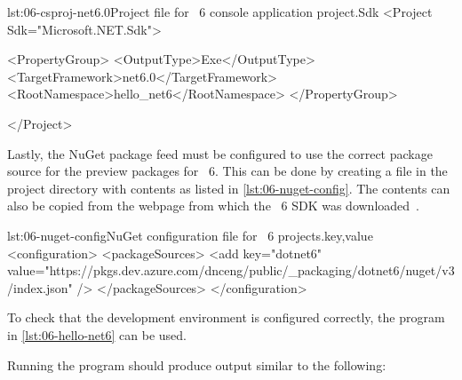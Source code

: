\begin{myListingXml}{lst:06-csproj-net6.0}{Project file for \dotnet{}~6 console application project.}{Sdk}
<Project Sdk="Microsoft.NET.Sdk">

  <PropertyGroup>
    <OutputType>Exe</OutputType>
    <TargetFramework>net6.0</TargetFramework>
    <RootNamespace>hello_net6</RootNamespace>
  </PropertyGroup>

</Project>
\end{myListingXml}

Lastly, the NuGet package feed must be configured to use the correct package source for the preview
packages for \dotnet{}~6. This can be done by creating a  file in the project
directory with contents as listed in \autoref{lst:06-nuget-config}. The contents can also be copied
from the webpage from which the \dotnet{}~6 SDK was downloaded~\cite{dotnetSdkGithub}.

\begin{myListingXml}[basicstyle=\ttfamily\scriptsize]{lst:06-nuget-config}{NuGet configuration file for \dotnet{}~6 projects.}{key,value}
<configuration>
  <packageSources>
    <add key="dotnet6"
      value="https://pkgs.dev.azure.com/dnceng/public/_packaging/dotnet6/nuget/v3/index.json" />
  </packageSources>
</configuration>
\end{myListingXml}

To check that the development environment is configured correctly, the program in
\autoref{lst:06-hello-net6} can be used.


Running the program should produce output similar to the following:

